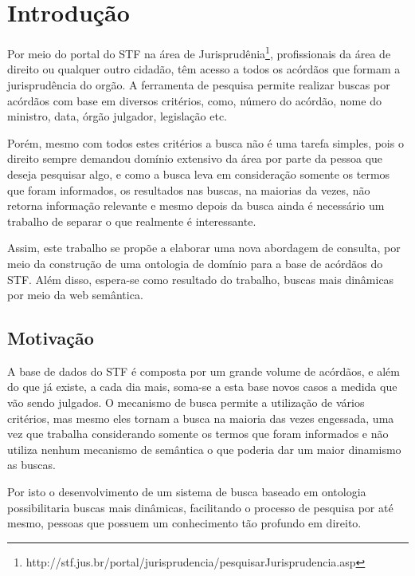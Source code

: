 \chapter{Introdução}
\label{cap:introducao}

Por meio do portal do STF na área de Jurisprudênia\footnote{http://stf.jus.br/portal/jurisprudencia/pesquisarJurisprudencia.asp}, 
profissionais da área de direito ou qualquer outro cidadão, têm acesso a todos 
os acórdãos que formam a jurisprudência do orgão. A ferramenta de pesquisa permite 
realizar buscas por acórdãos com base em diversos critérios, como, número do 
acórdão, nome do ministro, data, órgão julgador, legislação etc. 

Porém, mesmo com todos estes critérios a busca não é uma tarefa simples, pois 
o direito sempre demandou domínio extensivo da área por parte da pessoa que deseja 
pesquisar algo, e como a busca leva em consideração somente os termos que foram 
informados, os resultados nas buscas, na maiorias da vezes, não retorna 
informação relevante e mesmo depois da busca ainda é necessário um trabalho de 
separar o que realmente é interessante.

Assim, este trabalho se propõe a elaborar uma nova abordagem de consulta, por meio
da construção de uma ontologia de domínio para a base de acórdãos do STF. Além 
disso, espera-se como resultado do trabalho, buscas mais dinâmicas por meio 
da web semântica.

\section{Motivação}
\label{sec:motivacao}

A base de dados do STF é composta por um grande volume de acórdãos, e além do que 
já existe, a cada dia mais, soma-se a esta base novos casos a medida que vão sendo
julgados. O mecanismo de busca permite a utilização de vários critérios, mas 
mesmo eles tornam a busca na maioria das vezes engessada, uma vez que trabalha 
considerando somente os termos que foram informados e não utiliza nenhum 
mecanismo de semântica o que poderia dar um maior dinamismo as buscas.

Por isto o desenvolvimento de um sistema de busca baseado em ontologia 
possibilitaria buscas mais dinâmicas, facilitando o processo de pesquisa por 
até mesmo, pessoas que possuem um conhecimento tão profundo em direito.


